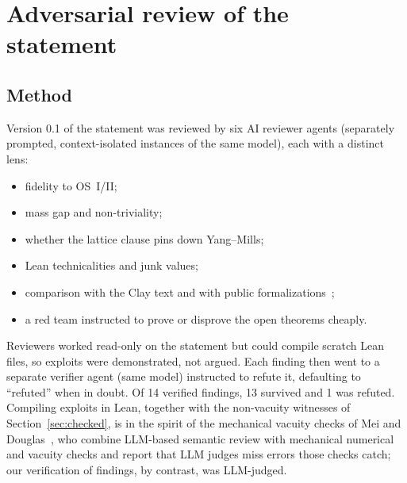 \documentclass[11pt]{article}
\theoremstyle{definition}
\theoremstyle{remark}
\begin{document}
\section{Adversarial review of the statement}\label{sec:review}

\subsection{Method}
Version 0.1 of the statement was reviewed by six AI reviewer agents (separately prompted,
context-isolated instances of the same model), each with a distinct lens:
\begin{itemize}[leftmargin=*]
\item fidelity to OS~I/II;
\item mass gap and non-triviality;
\item whether the lattice clause pins down Yang--Mills;
\item Lean technicalities and junk values;
\item comparison with the Clay text and with public formalizations~\cite{Cherkis2026,Yin2026,OpenAI2026m,OpenAI2026j};
\item a red team instructed to prove or disprove the open theorems cheaply.
\end{itemize}
Reviewers worked read-only on the statement but could compile scratch Lean files, so exploits
were demonstrated, not argued. Each finding then went to a separate verifier agent (same model)
instructed to refute it, defaulting to ``refuted'' when in doubt. Of 14 verified findings, 13
survived and 1 was refuted. Compiling exploits in Lean, together with the non-vacuity witnesses of
Section~\ref{sec:checked}, is in the spirit of the mechanical vacuity checks of Mei and
Douglas~\cite{Mei2026}, who combine LLM-based semantic review with mechanical numerical and vacuity
checks and report that LLM judges miss errors those checks catch; our verification of findings, by
contrast, was LLM-judged.
\end{document}
